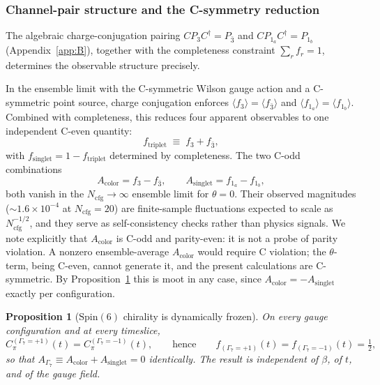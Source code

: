 \documentclass[12pt]{article}
\newtheorem{proposition}[theorem]{Proposition}
\theoremstyle{definition}
\theoremstyle{remark}
\newcommand{\spin}{\mathrm{Spin}}       %
\newcommand{\half}{\tfrac{1}{2}}
\newcommand{\GaSeven}{\Gamma_7}                      %
\newcommand{\ftriplet}{f_{\mathrm{triplet}}}          %
\newcommand{\fsinglet}{f_{\mathrm{singlet}}}          %
\newcommand{\Ncfg}{N_{\mathrm{cfg}}}                  %
\begin{document}
	\subsubsection{Channel-pair structure and the C-symmetry reduction}
	\label{sec:channel-pair}
	
	The algebraic charge-conjugation pairing $CP_3C^\dagger = P_{\bar{3}}$ and
	$CP_{1_a}C^\dagger = P_{1_b}$ (Appendix~\ref{app:B}), together with the
	completeness constraint $\sum_r f_r = 1$, determines the observable structure
	precisely.
	
	In the ensemble limit with the C-symmetric Wilson gauge action and a
	C-symmetric point source, charge conjugation enforces
	$\langle f_3\rangle = \langle f_{\bar{3}}\rangle$ and
	$\langle f_{1_a}\rangle = \langle f_{1_b}\rangle$.  Combined with completeness,
	this reduces four apparent observables to one independent C-even quantity:
	\begin{equation}
		\ftriplet \;\equiv\; f_3 + f_{\bar{3}},
		\label{eq:f-triplet}
	\end{equation}
	with $\fsinglet = 1 - \ftriplet$ determined by completeness.  The two C-odd
	combinations
	\begin{equation}
		A_{\mathrm{color}} = f_3 - f_{\bar{3}},
		\qquad
		A_{\mathrm{singlet}} = f_{1_a} - f_{1_b},
		\label{eq:C-odd-combos}
	\end{equation}
	both vanish in the $\Ncfg\to\infty$ ensemble limit for $\theta=0$.  Their
	observed magnitudes ($\sim1.6\times10^{-4}$ at $\Ncfg=20$) are finite-sample
	fluctuations expected to scale as $\Ncfg^{-1/2}$, and they serve as
	self-consistency checks rather than physics signals.  We note explicitly that
	$A_{\mathrm{color}}$ is C-odd and parity-even: it is not a probe of parity
	violation.  A nonzero ensemble-average $A_{\mathrm{color}}$ would require
	C violation; the $\theta$-term, being C-even, cannot generate it, and the
	present calculations are C-symmetric.  By
	Proposition~\ref{prop:gamma7-frozen} this is moot in any case, since
	$A_{\mathrm{color}} = -A_{\mathrm{singlet}}$ exactly per configuration.
	
	\begin{proposition}[$\spin(6)$ chirality is dynamically frozen]
	\label{prop:gamma7-frozen}
		On every gauge configuration and at every timeslice,
		\begin{equation}
			C_\pi^{(\GaSeven=+1)}(t) = C_\pi^{(\GaSeven=-1)}(t),
			\qquad\text{hence}\qquad
			f_{(\GaSeven=+1)}(t) = f_{(\GaSeven=-1)}(t) = \half ,
			\label{eq:gamma7-half}
		\end{equation}
		so that $A_{\GaSeven} \equiv A_{\mathrm{color}} + A_{\mathrm{singlet}} = 0$
		identically.  The result is independent of $\beta$, of $t$, and of the
		gauge field.
	\end{proposition}
	
\end{document}
